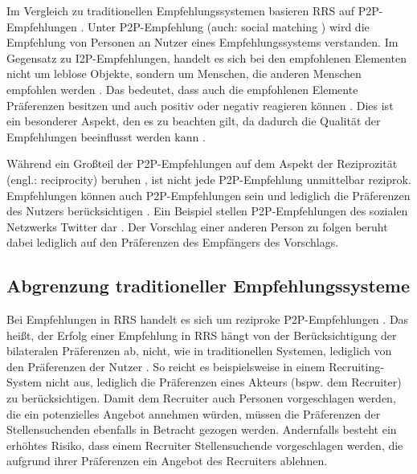 
Im Vergleich zu traditionellen Empfehlungssystemen basieren \ac{RRS} auf \ac{P2P}-Empfehlungen \cite[S. 207]{pizzato:2010}.
Unter \ac{P2P}-Empfehlung (auch: social matching \cite[S. 208]{pizzato:2010}) wird die Empfehlung von Personen an Nutzer eines Empfehlungssystems verstanden.
Im Gegensatz zu \ac{I2P}-Empfehlungen, handelt es sich bei den empfohlenen Elementen nicht um leblose Objekte, sondern um Menschen, die anderen Menschen empfohlen werden \cite[S. 2]{kazienko:inbook}.
Das bedeutet, dass auch die empfohlenen Elemente Präferenzen besitzen und auch positiv oder negativ reagieren können \cite[S. 2]{kazienko:inbook}.
Dies ist ein besonderer Aspekt, den es zu beachten gilt, da dadurch die Qualität der Empfehlungen beeinflusst werden kann \cite[S. 208]{pizzato:2010}\cite[S. 2199]{akehurst:inproceedings}.

Während ein Großteil der \ac{P2P}-Empfehlungen auf dem Aspekt der Reziprozität (engl.: reciprocity) beruhen \cite[S. 545]{koprinska:inbook}, ist nicht jede \ac{P2P}-Empfehlung unmittelbar reziprok.
Empfehlungen können auch \ac{P2P}-Empfehlungen sein und lediglich die Präferenzen des Nutzers berücksichtigen \cite[S. 2429]{palomares:inproceedings}.
Ein Beispiel stellen \ac{P2P}-Empfehlungen des sozialen Netzwerks Twitter dar \cite[S. 2429]{palomares:inproceedings}.
Der Vorschlag einer anderen Person zu folgen beruht dabei lediglich auf den Präferenzen des Empfängers des Vorschlags.

\subsection{Abgrenzung traditioneller Empfehlungssysteme}
\label{ch:empfehlungssysteme:rrs:traditional_vs_rrs}
Bei Empfehlungen in \ac{RRS} handelt es sich um reziproke \ac{P2P}-Empfehlungen \cite[S. 207]{pizzato:2010}.
Das heißt, der Erfolg einer Empfehlung in \ac{RRS} hängt von der Berücksichtigung der bilateralen Präferenzen ab, nicht, wie in traditionellen Systemen, lediglich von den Präferenzen der Nutzer \cite[S. 1468]{yildirim:article}.
So reicht es beispielsweise in einem Recruiting-System nicht aus, lediglich die Präferenzen eines Akteurs (bspw. dem Recruiter) zu berücksichtigen.
Damit dem Recruiter auch Personen vorgeschlagen werden, die ein potenzielles Angebot annehmen würden, müssen die Präferenzen der Stellensuchenden ebenfalls in Betracht gezogen werden.
Andernfalls besteht ein erhöhtes Risiko, dass einem Recruiter Stellensuchende vorgeschlagen werden, die aufgrund ihrer Präferenzen ein Angebot des Recruiters ablehnen.

